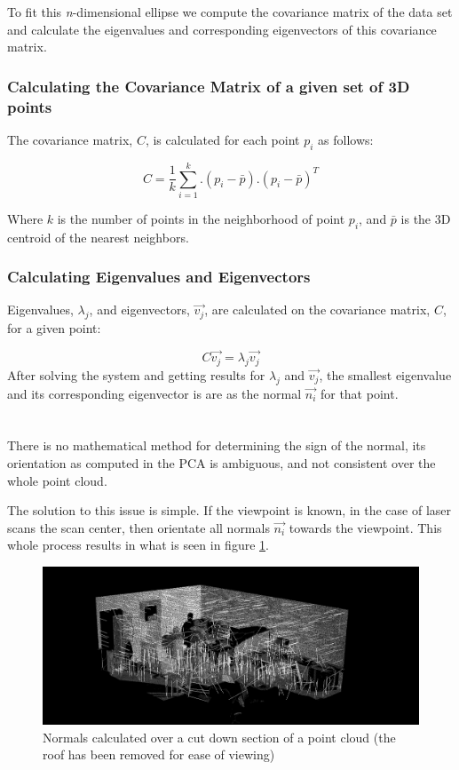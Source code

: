 		To fit this \textit{n}-dimensional ellipse we compute the covariance matrix of the data set and calculate the eigenvalues and corresponding eigenvectors of this covariance matrix.
		
		\subsubsection{Calculating the Covariance Matrix of a given set of 3D points}
			The covariance matrix, $C$, is calculated for each point $p_i$ as follows:
			
			\begin{equation}
			C = \frac{1}{k} \sum_{i=1}^{k}.(p_i - \bar{p}).(p_i - \bar{p})^T
			\end{equation}
			
			Where $k$ is the number of points in the neighborhood of point $p_i$, and $\bar{p}$ is the 3D centroid of the nearest neighbors.
				
		\subsubsection{Calculating Eigenvalues and Eigenvectors}
			Eigenvalues, $\lambda_j$, and eigenvectors, $\vec{v_j}$, are calculated on the covariance matrix, $C$, for a given point:
			
			\begin{equation}
			C \vec{v_j} = \lambda_j \vec{v_j}
			\end{equation}
			After solving the system and getting results for $\lambda_j$ and $\vec{v_j}$, the smallest eigenvalue and its corresponding eigenvector is are as the normal $\vec{n_i}$ for that point.\\
			\\
			\\
			There is no mathematical method for determining the sign of the normal, its orientation as computed in the PCA is ambiguous, and not consistent over the whole point cloud. 
			
			The solution to this issue is simple. If the viewpoint is known, in the case of laser scans the scan center, then orientate all normals $\vec{n_i}$ towards the viewpoint. This whole process results in what is seen in figure \ref{fig:Normals}.
			
			\begin{figure}[H]
			\centering
			\includegraphics[width=1\linewidth]{Includes/images/Normals}
			\caption{Normals calculated over a cut down section of a point cloud (the roof has been removed for ease of viewing)}
			\label{fig:Normals}
			\end{figure}
		

